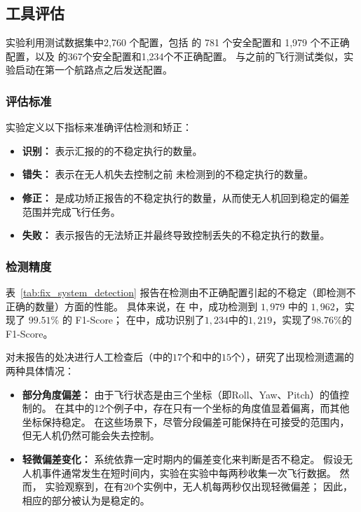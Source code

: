 

\subsection{工具评估}
实验利用测试数据集中2,760 个配置，包括 的 781 个安全配置和 1,979 个不正确配置，以及  的367个安全配置和1,234个不正确配置。
与之前的飞行测试类似，实验启动在第一个航路点之后发送配置。

\subsubsection{评估标准}
实验定义以下指标来准确评估检测和矫正：

\begin{itemize}
\item \textbf{识别：} 表示\nyctea 汇报的的不稳定执行的数量。

\item \textbf{错失：} 表示在无人机失去控制之前 \nyctea 未检测到的不稳定执行的数量。

\item \textbf{修正：} 是\nyctea 成功矫正报告的不稳定执行的数量，从而使无人机回到稳定的偏差范围并完成飞行任务。

\item \textbf{失败：} 表示报告的无法矫正并最终导致控制丢失的不稳定执行的数量。
\end{itemize}

\subsubsection{检测精度}
表~\ref{tab:fix_system_detection} 报告\nyctea 在检测由不正确配置引起的不稳定（即检测不正确的数量）方面的性能。
具体来说，在  中，\nyctea 成功检测到 $1,979$ 中的 $1,962$，实现了 $99.51\%$ 的 F1-Score； 在中，\nyctea 成功识别了$1,234$中的$1,219$，实现了$98.76\%$的F1-Score。




对未报告的处决进行人工检查后（中的$17$个和中的$15$个），研究了\nyctea 出现检测遗漏的两种具体情况：
\begin{itemize}
\item \textbf{部分角度偏差：} 由于飞行状态是由三个坐标（即Roll、Yaw、Pitch）的值控制的。
在其中的12个例子中，存在只有一个坐标的角度值显着偏离，而其他坐标保持稳定。
在这些场景下，尽管分段偏差可能保持在可接受的范围内，但无人机仍然可能会失去控制。


\item \textbf{轻微偏差变化：} 系统依靠一定时期内的偏差变化来判断是否不稳定。
假设无人机事件通常发生在短时间内，实验在实验中每两秒收集一次飞行数据。
然而， 实验观察到，在有20个实例中，无人机每两秒仅出现轻微偏差； 因此，相应的部分被认为是稳定的。
\end{itemize}


